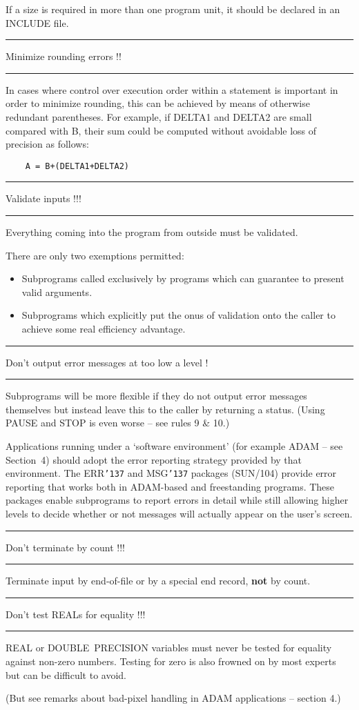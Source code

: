 \documentclass[twoside,11pt]{article}
\newcounter{sruleno}
\newcommand{\srule}[1]{
    \addtocounter{sruleno}{1}
    \goodbreak
    \rule[0.5ex]{\textwidth}{0.3mm}
    {\Large #1 \hfill {\thesruleno}}
    \rule[0.5ex]{\textwidth}{0.1mm}
}
\newcommand{\srule}[1]{
       \addtocounter{sruleno}{1}
       \begin{rawhtml} <HR> \end{rawhtml}
       {\Large \thesruleno}~~~~{\Large #1}
       \begin{rawhtml} <HR> \end{rawhtml}
       \end{tabular}
  }
\renewcommand{\_}{{\tt\char'137}}
\begin{document}
If a size is required in more than one program unit, it should be
declared in an INCLUDE file.

\srule{Minimize rounding errors !!}
In cases where control over execution order within a
statement is important in order to minimize rounding, this
can be achieved by means of otherwise redundant parentheses.
For example, if DELTA1 and DELTA2 are small compared with B, their sum could be
computed without avoidable loss of precision as follows:
\begin{verbatim}
    A = B+(DELTA1+DELTA2)
\end{verbatim}

\srule{Validate inputs !!!}
Everything coming into the program from outside must be validated.

There are only two exemptions permitted:
\begin{itemize}
\item Subprograms called exclusively by programs which can guarantee to present
valid arguments.
\item Subprograms which explicitly put the onus of validation onto the caller to
achieve some real efficiency advantage.
\end{itemize}

\srule{Don't output error messages at too low a level !}
Subprograms will be more flexible if they
do not output error messages themselves but
instead leave this to the caller by returning a status.
(Using PAUSE and STOP is even worse -- see rules 9 \& 10.)

Applications running under a `software environment' (for example ADAM -- see
Section~4) should adopt the error reporting
strategy provided by that environment.  The
ERR\_ and MSG\_ packages (SUN/104) provide error reporting that works both
in ADAM-based and freestanding programs.  These packages enable subprograms
to report errors in detail while still allowing higher levels to
decide whether or not messages will actually appear on the user's
screen.

\srule{Don't terminate by count !!!}
Terminate input by end-of-file or by a special end record, {\bf not} by
count.

\srule{Don't test REALs for equality !!!}
REAL or DOUBLE~PRECISION variables must never be tested for equality
against non-zero numbers.  Testing for zero is also frowned on by most
experts but can be difficult to avoid.

(But see remarks about bad-pixel handling in ADAM applications -- section 4.)
\end{document}
